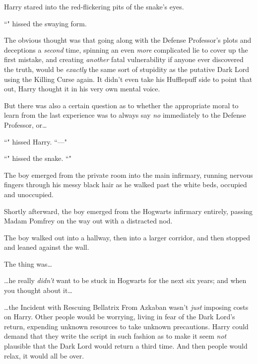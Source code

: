 Harry stared into the red-flickering pits of the snake's eyes.

``" hissed the swaying form.

The obvious thought was that going along with the Defense Professor's plots and deceptions a \emph{second} time, spinning an even \emph{more} complicated lie to cover up the first mistake, and creating \emph{another} fatal vulnerability if anyone ever discovered the truth, would be \emph{exactly} the same sort of stupidity as the putative Dark Lord using the Killing Curse again. It didn't even take his Hufflepuff side to point that out, Harry thought it in his very own mental voice.

But there was also a certain question as to whether the appropriate moral to learn from the last experience was to always say \emph{no} immediately to the Defense Professor, or{\ldots}

``" hissed Harry. ``---"

``" hissed the snake. ``"

\later

The boy emerged from the private room into the main infirmary, running nervous fingers through his messy black hair as he walked past the white beds, occupied and unoccupied.

Shortly afterward, the boy emerged from the Hogwarts infirmary entirely, passing Madam Pomfrey on the way out with a distracted nod.

The boy walked out into a hallway, then into a larger corridor, and then stopped and leaned against the wall.

The thing was{\ldots}

{\ldots}he really \emph{didn't} want to be stuck in Hogwarts for the next six years; and when you thought about it{\ldots}

{\ldots}the Incident with Rescuing Bellatrix From Azkaban wasn't \emph{just} imposing costs on Harry. Other people would be worrying, living in fear of the Dark Lord's return, expending unknown resources to take unknown precautions. Harry could demand that they write the script in such fashion as to make it seem \emph{not} plausible that the Dark Lord would return a third time. And then people would relax, it would all be over.

